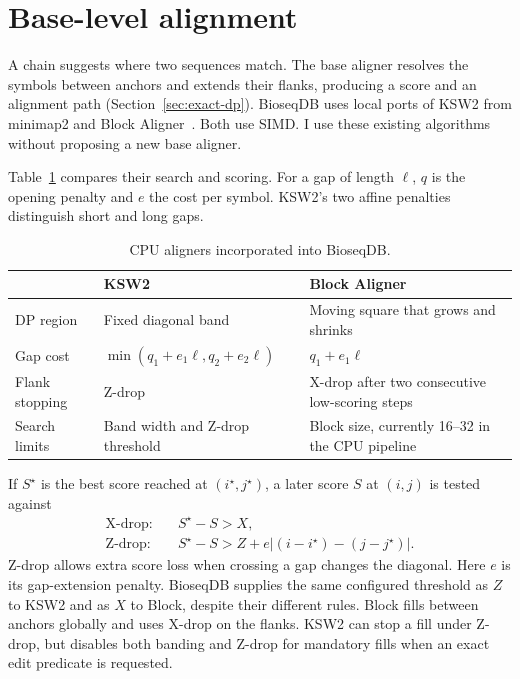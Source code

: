 \section{Base-level alignment}
\label{sec:final-alignment-role}
\label{sec:final-alignment-cpu-contracts}

A chain suggests where two sequences match. The base aligner resolves the
symbols between anchors and extends their flanks, producing a score and an
alignment path (Section~\ref{sec:exact-dp}). BioseqDB uses local ports of KSW2
from minimap2 and Block Aligner~\cite{minimap2_paper,block_aligner_paper}.
Both use SIMD. I use these existing algorithms without proposing a new base
aligner.

Table~\ref{tab:final-aligner-comparison} compares their search and scoring.
For a gap of length \(\ell\), \(q\) is the opening penalty and \(e\) the
cost per symbol. KSW2's two affine penalties distinguish short and long gaps.

\begin{table}[H]
\centering
\small
\caption{CPU aligners incorporated into BioseqDB.}
\label{tab:final-aligner-comparison}
\setlength{\tabcolsep}{4pt}
\renewcommand{\arraystretch}{1.1}
\begin{tabularx}{\linewidth}{@{}>{\raggedright\arraybackslash}p{.19\linewidth}
  >{\raggedright\arraybackslash}X >{\raggedright\arraybackslash}X@{}}
\toprule
 & \textbf{KSW2} & \textbf{Block Aligner}\\
\midrule
DP region & Fixed diagonal band & Moving square that grows and shrinks\\
Gap cost & \(\min(q_1+e_1\ell,q_2+e_2\ell)\) & \(q_1+e_1\ell\)\\
Flank stopping & Z-drop & X-drop after two consecutive low-scoring steps\\
Search limits & Band width and Z-drop threshold
 & Block size, currently 16--32 in the CPU pipeline\\
\bottomrule
\end{tabularx}
\end{table}

If \(S^\star\) is the best score reached at \((i^\star,j^\star)\), a later
score \(S\) at \((i,j)\) is tested against
\begin{equation}
\begin{aligned}
  \text{X-drop:}\quad&S^\star-S>X,\\
  \text{Z-drop:}\quad&S^\star-S>Z+e\left|(i-i^\star)-(j-j^\star)\right|.
\end{aligned}
\label{eq:zdrop}
\end{equation}
Z-drop allows extra score loss when crossing a gap changes the diagonal.
Here \(e\) is its gap-extension penalty. BioseqDB supplies the same configured
threshold as \(Z\) to KSW2 and as \(X\) to Block, despite their different rules.
Block fills between anchors globally and uses X-drop on the flanks.
KSW2 can stop a fill under Z-drop, but disables both banding and Z-drop for
mandatory fills when an exact edit predicate is requested.

